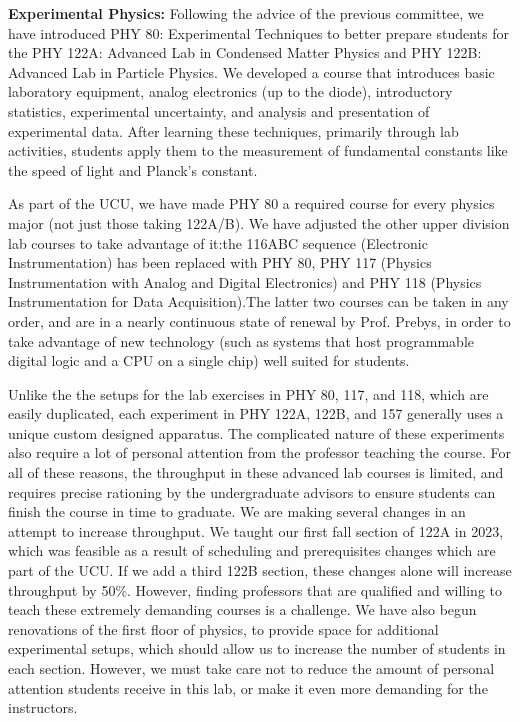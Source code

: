 \documentclass[12pt]{article}
\begin{document}
\noindent
{\bf Experimental Physics:} Following the advice of the previous
committee, we have introduced PHY 80: Experimental Techniques to
better prepare students for the PHY 122A: Advanced Lab in Condensed
Matter Physics and PHY 122B: Advanced Lab in Particle Physics.  We
developed a course that introduces basic laboratory equipment, analog
electronics (up to the diode), introductory statistics, experimental
uncertainty, and analysis and presentation of experimental data.
After learning these techniques, primarily through lab activities,
students apply them to the measurement of fundamental constants like
the speed of light and Planck's constant.

As part of the UCU, we have made PHY 80 a required course for every
physics major (not just those taking 122A/B).  We have adjusted the
other upper division lab courses to take advantage of it:the 116ABC
sequence (Electronic Instrumentation) has been replaced with PHY 80,
PHY 117 (Physics Instrumentation with Analog and Digital Electronics)
and PHY 118 (Physics Instrumentation for Data Acquisition).The latter
two courses can be taken in any order, and are in a nearly continuous
state of renewal by Prof. Prebys, in order to take advantage of new
technology (such as systems that host programmable digital logic and a
CPU on a single chip) well suited for students.

Unlike the the setups for the lab exercises in PHY 80, 117, and 118,
which are easily duplicated, each experiment in PHY 122A, 122B, and
157 generally uses a unique custom designed apparatus.  The
complicated nature of these experiments also require a lot of personal
attention from the professor teaching the course.  For all of these
reasons, the throughput in these advanced lab courses is limited, and
requires precise rationing by the undergraduate advisors to ensure
students can finish the course in time to graduate.  We are making
several changes in an attempt to increase throughput.  We taught our
first fall section of 122A in 2023, which was feasible as a result of
scheduling and prerequisites changes which are part of the UCU.  If we
add a third 122B section, these changes alone will increase throughput
by 50\%.  However, finding professors that are qualified and willing
to teach these extremely demanding courses is a challenge.  We have
also begun renovations of the first floor of physics, to provide space
for additional experimental setups, which should allow us to increase
the number of students in each section.  However, we must take care
not to reduce the amount of personal attention students receive in
this lab, or make it even more demanding for the instructors.
\end{document}
